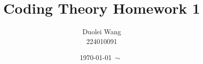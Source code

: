 \title{Coding Theory Homework 1}
\author{
    Duolei Wang \\ 
    224010091 \\
}
\date{\today~\( \sim \)~}

